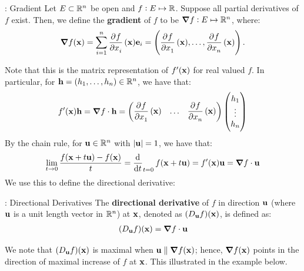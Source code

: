 \begin{ndef}{: Gradient}{}
    Let $E \subset \mathbb{R}^n$ be open and $f: E \mapsto \mathbb{R}$. Suppose all partial derivatives of $f$ exist. Then, we define the \textbf{gradient} of $f$ to be $\grad{f}: E \mapsto \mathbb{R}^n$, where:
    \begin{align*}
        \grad{f}(\v{x}) = \sum_{i=1}^n \dpd{f}{x_i}(\v{x})\v{e}_i = \left(\dpd{f}{x_1}(\v{x}), \ldots, \dpd{f}{x_n}(\v{x})\right).
    \end{align*}
\end{ndef}
\noindent Note that this is the matrix representation of $f'(\mathbf{x})$ for real valued $f$. In particular, for $\mathbf{h} = (h_1, \ldots, h_n) \in \mathbb{R}^n$, we have that:
\begin{align*}
    f'(\v{x})\v{h} = \grad{f}\cdot\v{h} = \begin{pmatrix}
    \dpd{f}{x_1}(\v{x}) & \ldots & \dpd{f}{x_n}(\v{x})
    \end{pmatrix}
    \begin{pmatrix}
        h_1
        \\ \vdots
        \\ h_n
    \end{pmatrix}
\end{align*}
\noindent By the chain rule, for $\mathbf{u} \in \mathbb{R}^n$ with $\abs{\mathbf{u}} = 1$, we have that:
\begin{align*}
    \lim_{t \rightarrow 0} \frac{f(\v{x} + t\v{u}) - f(\v{x})}{t} = \dod{}{t}_{t = 0}f(\v{x} + t\v{u}) = f'(\v{x})\v{u} = \grad{f}\cdot \v{u}
\end{align*}
\noindent We use this to define the directional derivative:

\begin{ndef}{: Directional Derivatives}{}
    The \textbf{directional derivative} of $f$ in direction $\mathbf{u}$ (where $\mathbf{u}$ is a unit length vector in $\mathbb{R}^n$) at $\mathbf{x}$, denoted as $(D_{\mathbf{u}}f)(\mathbf{x})$, is defined as:
    \begin{align*}
        (D_{\mathbf{u}}f)(\mathbf{x}) = \grad{f}\cdot\mathbf{u}
    \end{align*}
\end{ndef}
\noindent We note that $(D_{\mathbf{u}}f)(\mathbf{x})$ is maximal when $\mathbf{u} \parallel \grad{f}(\mathbf{x})$; hence, $\grad{f}(\mathbf{x})$ points in the direction of maximal increase of $f$ at $\mathbf{x}$. This illustrated in the example below. 

